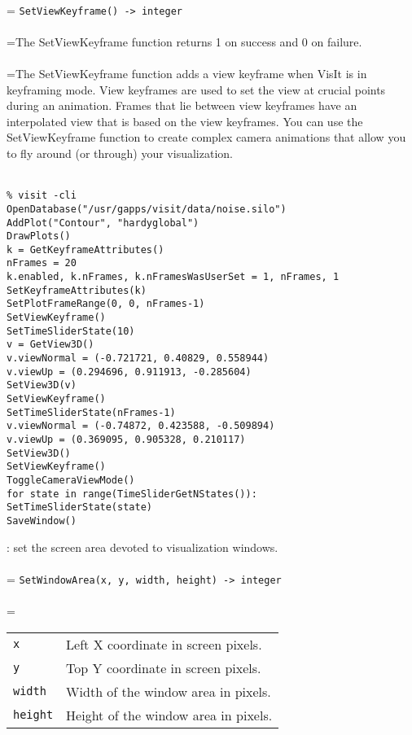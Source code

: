 \documentclass[10pt,a4paper]{report}
\begin{document}
 \\ 
\hangindent=\parindent 
\verb!SetViewKeyframe() -> integer!\\ [-3mm]

 \\ 
\hangindent=\parindent The SetViewKeyframe function returns 1 on success and 0 on failure. \\[-3mm] 

 \\ 
\hangindent=\parindent The SetViewKeyframe function adds a view keyframe when VisIt is in keyframing mode. View keyframes are used to set the view at crucial points during an animation. Frames that lie between view keyframes have an interpolated view that is based on the view keyframes. You can use the SetViewKeyframe function to create complex camera animations that allow you to fly around (or through) your visualization. \\[-3mm] 

\\[-6mm]
\begin{verbatim}% visit -cli
OpenDatabase("/usr/gapps/visit/data/noise.silo")
AddPlot("Contour", "hardyglobal")
DrawPlots()
k = GetKeyframeAttributes()
nFrames = 20
k.enabled, k.nFrames, k.nFramesWasUserSet = 1, nFrames, 1
SetKeyframeAttributes(k)
SetPlotFrameRange(0, 0, nFrames-1)
SetViewKeyframe()
SetTimeSliderState(10)
v = GetView3D()
v.viewNormal = (-0.721721, 0.40829, 0.558944)
v.viewUp = (0.294696, 0.911913, -0.285604)
SetView3D(v)
SetViewKeyframe()
SetTimeSliderState(nFrames-1)
v.viewNormal = (-0.74872, 0.423588, -0.509894)
v.viewUp = (0.369095, 0.905328, 0.210117)
SetView3D()
SetViewKeyframe()
ToggleCameraViewMode()
for state in range(TimeSliderGetNStates()):
SetTimeSliderState(state)
SaveWindow()
\end{verbatim}
\newpage


{}
: set the screen area devoted to visualization windows.\\[-3mm]

 \\ 
\hangindent=\parindent 
\verb!SetWindowArea(x, y, width, height) -> integer!\\ [-3mm]

 \\ 
\hangindent=\parindent 
\begin{tabular}{ll}
\verb!x! & Left X coordinate in screen pixels. \\
\verb!y! & Top Y coordinate in screen pixels. \\
\verb!width! & Width of the window area in pixels. \\
\verb!height! & Height of the window area in pixels. \\
\end{tabular} \\[-2mm]
\end{document}
